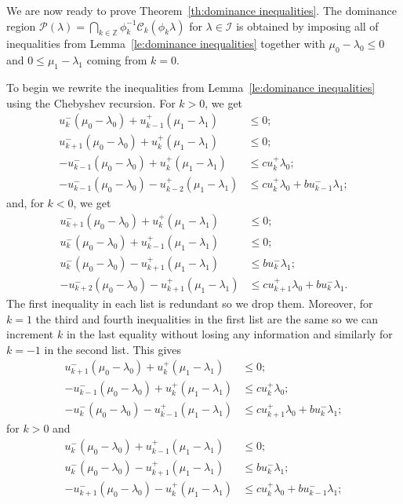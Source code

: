 \documentclass{amsart}
\numberwithin{theorem}{section}
\newcommand{\cC}{\mathcal{C}}
\newcommand{\cI}{\mathcal{I}}
\newcommand{\cP}{\mathcal{P}}
\newcommand{\ZZ}{\mathbb{Z}}
\begin{document}
  We are now ready to prove Theorem~\ref{th:dominance inequalities}.
  The dominance region $\cP(\lambda)=\bigcap_{k\in\ZZ}\phi_k^{-1}\cC_k(\phi_k\lambda)$ for $\lambda\in\cI$ is obtained by imposing all of inequalities from Lemma~\ref{le:dominance inequalities} together with $\mu_0 -\lambda_0 \le 0$ and $0 \le \mu_1 - \lambda_1$ coming from $k=0$.

  To begin we rewrite the inequalities from Lemma~\ref{le:dominance inequalities} using the Chebyshev recursion.
  For $k>0$, we get
  \begin{align*}
    u_k^-(\mu_0-\lambda_0)+u_{k-1}^+(\mu_1-\lambda_1) &\le 0;\\
    u_{k+1}^-(\mu_0-\lambda_0)+u_k^+(\mu_1-\lambda_1) &\le 0;\\
    -u_{k-1}^-(\mu_0-\lambda_0)+u_k^+(\mu_1-\lambda_1) &\le cu_k^+\lambda_0;\\
    -u_{k-1}^-(\mu_0-\lambda_0)-u_{k-2}^+(\mu_1-\lambda_1) &\le cu_k^+\lambda_0+bu_{k-1}^-\lambda_1;
  \end{align*}
  and, for $k<0$, we get
  \begin{align*}
    u_{k+1}^-(\mu_0-\lambda_0)+u_k^+(\mu_1-\lambda_1) &\le 0;\\
    u_k^-(\mu_0-\lambda_0)+u_{k-1}^+(\mu_1-\lambda_1) &\le 0;\\
    u_k^-(\mu_0-\lambda_0)-u_{k+1}^+(\mu_1-\lambda_1) &\le bu_k^-\lambda_1;\\
    -u_{k+2}^-(\mu_0-\lambda_0)-u_{k+1}^+(\mu_1-\lambda_1) &\le cu_{k+1}^+\lambda_0+bu_k^-\lambda_1.
  \end{align*}
  The first inequality in each list is redundant so we drop them.
  Moreover, for $k=1$ the third and fourth inequalities in the first list are the same so we can increment $k$ in the last equality without losing any information and similarly for $k=-1$ in the second list. 
  This gives
  \begin{align*}
    u_{k+1}^-(\mu_0-\lambda_0)+u_k^+(\mu_1-\lambda_1) &\le 0;\\
    -u_{k-1}^-(\mu_0-\lambda_0)+u_k^+(\mu_1-\lambda_1) &\le cu_k^+\lambda_0;\\
    -u_k^-(\mu_0-\lambda_0)-u_{k-1}^+(\mu_1-\lambda_1) &\le cu_{k+1}^+\lambda_0+bu_k^-\lambda_1;
  \end{align*}
  for $k>0$ and
  \begin{align*}
    u_k^-(\mu_0-\lambda_0)+u_{k-1}^+(\mu_1-\lambda_1) &\le 0;\\
    u_k^-(\mu_0-\lambda_0)-u_{k+1}^+(\mu_1-\lambda_1) &\le bu_k^-\lambda_1;\\
    -u_{k+1}^-(\mu_0-\lambda_0)-u_k^+(\mu_1-\lambda_1) &\le cu_k^+\lambda_0+bu_{k-1}^-\lambda_1;
  \end{align*}
\end{document}
